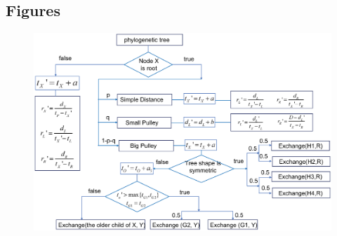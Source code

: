 \documentclass{bmcart}
\begin{document}
\begin{backmatter}



\section*{Figures}
\begin{figure}[h!]
\includegraphics[width=12cm]{Fig01-flowchart.eps}\\
\caption{}
\label{flowchart}
\end{figure}


\end{backmatter}
\end{document}
